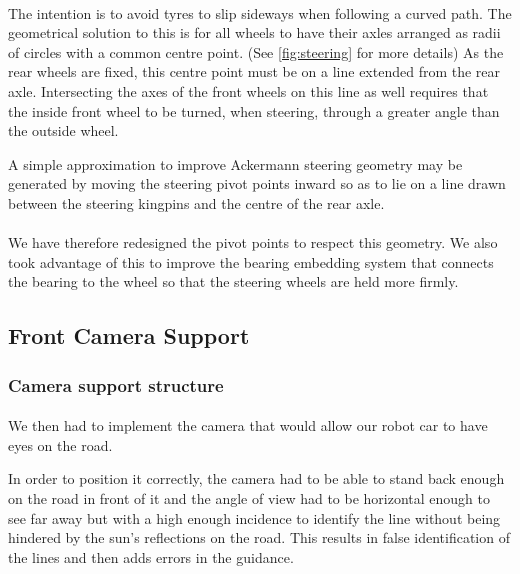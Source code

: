 \paragraph{}
The intention is to avoid tyres to slip sideways when following a curved path.
The geometrical solution to this is for all wheels to have their axles arranged
as radii of circles with a common centre point. (See \ref{fig:steering} for more details)
As the rear wheels are fixed, this centre point must be on a line extended from
the rear axle.
Intersecting the axes of the front wheels on this line as well requires that the
inside front wheel to be turned, when steering, through a greater angle than the
outside wheel.

A simple approximation to improve Ackermann steering geometry may be generated by
moving the steering pivot points inward so as to lie on a line drawn between the
steering kingpins and the centre of the rear axle.

\paragraph{}
We have therefore redesigned the pivot points to respect this geometry. We also
took advantage of this to improve the bearing embedding system that connects the
bearing to the wheel so that the steering wheels are held more firmly.

\subsection{Front Camera Support}

\subsubsection{Camera support structure}
\paragraph{}
We then had to implement the camera that would allow our robot car to have eyes
on the road.

In order to position it correctly, the camera had to be able to stand back enough
on the road in front of it and the angle of view had to be horizontal enough to see
far away but with a high enough incidence to identify the line without being
hindered by the sun's reflections on the road. This results in false identification
of the lines and then adds errors in the guidance.


